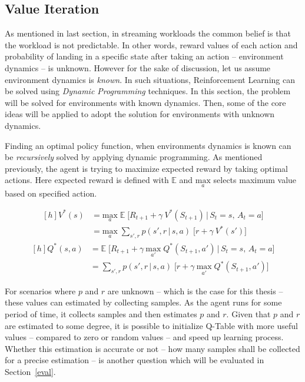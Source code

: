 \subsection{Value Iteration}
\label{des:val}

As mentioned in last section, in streaming workloads the common belief is that the workload is not predictable. In other words, reward values of each action and probability of landing in a specific state after taking an action -- environment dynamics -- is unknown. However for the sake of discussion, let us assume environment dynamics is \emph{known}. In such situations, Reinforcement Learning can be solved using \emph{Dynamic Programming} techniques. In this section, the problem will be solved for environments with known dynamics. Then, some of the core ideas will be applied to adopt the solution for environments with unknown dynamics.

Finding an optimal policy function, when environments dynamics is known can be \emph{recursively} solved by applying dynamic programming. As mentioned previously, the agent is trying to maximize expected reward by taking optimal actions. Here expected reward is defined with $\mathbb E$ and $\underset{a}{\text{max}}$ selects maximum value based on specified action.

\begin{equation}
\begin{aligned}[h]
V^*(s) &= \underset{a}{\text{max}} \; \mathbb E\;\big[R_{t+1} + \gamma\:V^*(S_{t+1})\,|\,S_t=s,\,A_t=a\big] \\
&= \underset{a}{\text{max}} \; \sum_{s',r} p(s',r\,|\,s,a)\;\Big[r + \gamma\:V^*(s')\Big]
\end{aligned}
\label{des:eq:dpv}
\end{equation}
\begin{equation}
\begin{aligned}[h]
Q^*(s,a) &= \mathbb E\;\big[R_{t+1} + \gamma\:\underset{a'}{\text{max}}\;Q^*(S_{t+1},a')\,|\,S_t=s,\,A_t=a\big] \\
&= \sum_{s',r} p(s',r\,|\,s,a)\;\Big[r + \gamma\:\underset{a'}{\text{max}}\;Q^*(S_{t+1},a')\Big]
\end{aligned}
\label{des:eq:dpq}
\end{equation}

For scenarios where $p$ and $r$ are unknown -- which is the case for this thesis -- these values can estimated by collecting samples. As the agent runs for some period of time, it collects samples and then estimates $p$ and $r$. Given that $p$ and $r$ are estimated to some degree, it is possible to initialize Q-Table with more useful values -- compared to zero or random values -- and speed up learning process. Whether this estimation is accurate or not -- how many samples shall be collected for a precise estimation -- is another question which will be evaluated in Section~\ref{eval}.

